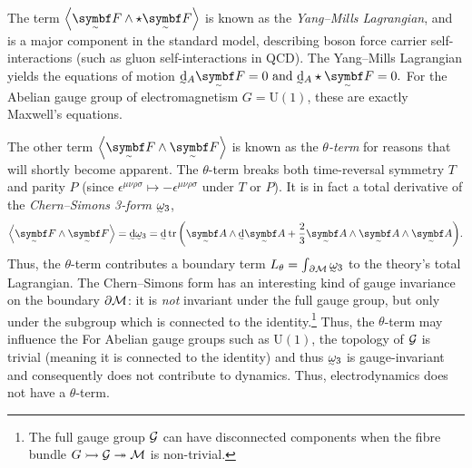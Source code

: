 The term $\ang{\tsbm F \wedge\star \tsbm F}$ is known as the \emph{Yang--Mills Lagrangian}, and is a major component in the standard model, describing boson force carrier self-interactions (such as gluon self-interactions in QCD).
The Yang--Mills Lagrangian yields\footnotemark{} the equations of motion 
\begin{math}
	\ts\dd_A\tsbm F = 0
	\text{ and }
	\ts\dd_A\star\tsbm F = 0
.\end{math}
For the Abelian gauge group of electromagnetism $G = \mathrm{U}(1)$, these are exactly Maxwell's equations.

The other term $\ang{\tsbm F \wedge \tsbm F}$ is known as the \emph{$\theta$-term} for reasons that will shortly become apparent.
The $\theta$-term breaks both time-reversal symmetry $T$ and parity $P$ (since $\epsilon^{\mu\nu\rho\sigma} \mapsto -\epsilon^{\mu\nu\rho\sigma}$ under $T$ or $P$).
It is in fact a total derivative of the \emph{Chern--Simons 3-form} $\csform$,
\begin{align}
	\ang{\tsbm F \wedge \tsbm F}
	= \ts\dd\csform
	= \ts\dd\tr\qty(\tsbm A\wedge\ts\dd\tsbm A + \frac{2}{3}\tsbm A\wedge\tsbm A\wedge\tsbm A)
.\end{align}
Thus, the $\theta$-term contributes a boundary term $L_\theta = \int_{\raisemath{1pt}{\,\partial\cal M}}\csform$ to the theory's total Lagrangian.
The Chern--Simons form has an interesting kind of gauge invariance on the boundary $\partial\cal M$: it is \emph{not} invariant under the full gauge group, but only under the subgroup which is connected to the identity.\footnote{
	The full gauge group $\cal G$ can have disconnected components when the fibre bundle $\fibrebundle{G}{\cal G}{\cal M}$ is non-trivial. 
}
Thus, the $\theta$-term may influence the
For Abelian gauge groups such as $\mathrm{U}(1)$, the topology of $\cal G$ is trivial (meaning it is connected to the identity) and thus $\csform$ is gauge-invariant and consequently does not contribute to dynamics.
Thus, electrodynamics does not have a $\theta$-term.


